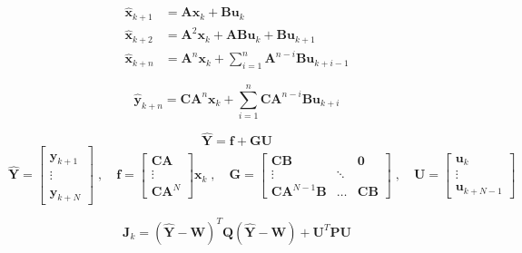 \documentclass{article}
\begin{document}
	\begin{align}
		\bm{\hat{x}}_{k+1} &= \bm{A}\bm{x}_k + \bm{B}\bm{u}_k \\
		\bm{\hat{x}}_{k+2} &= \bm{A}^2\bm{x}_k + \bm{A}\bm{B}\bm{u}_k + \bm{B}\bm{u}_{k+1}\\
		\bm{\hat{x}}_{k+n} &= \bm{A}^n\bm{x}_k + \sum_{i=1}^n \bm{A}^{n-i}\bm{B}\bm{u}_{k+i-1}
	\end{align}

	\begin{equation}
		\bm{\hat{y}}_{k+n} = \bm{C}\bm{A}^n\bm{x}_k + \sum_{i=1}^n \bm{C}\bm{A}^{n-i}\bm{B}\bm{u}_{k+i}
	\end{equation}

	\begin{equation}
		\bm{\hat{Y}} = \bm{f} + \bm{G}\bm{U}
	\end{equation}
	\begin{equation}
		\bm{\hat{Y}}
		=
		\begin{bmatrix}
			\bm{\hat{y}}_{k+1} \\
			\vdots \\
			\bm{\hat{y}}_{k+N}
		\end{bmatrix}
		\;,\quad 
		\bm{f}
		=
		\begin{bmatrix}
			\bm{C}\bm{A} \\
			\vdots \\
			\bm{C}\bm{A}^N
		\end{bmatrix}
		\bm{x}_k
		\;,\quad 
		\bm{G}
		=
		\begin{bmatrix}
			\bm{C}\bm{B} &  & \bm{0} \\
			\vdots & \ddots & \\
			\bm{C}\bm{A}^{N-1}\bm{B} & \dots & \bm{C}\bm{B}
		\end{bmatrix}
		\;,\quad 
		\bm{U}
		=
		\begin{bmatrix}
			\bm{u}_{k} \\
			\vdots \\
			\bm{u}_{k+N-1}
		\end{bmatrix}
	\end{equation}

	\begin{equation}
	\bm{J}_k = (\bm{\hat{Y}}-\bm{W})^T \bm{Q} (\bm{\hat{Y}}-\bm{W}) + \bm{U}^T\bm{P}\bm{U}
	\end{equation}
\end{document}
